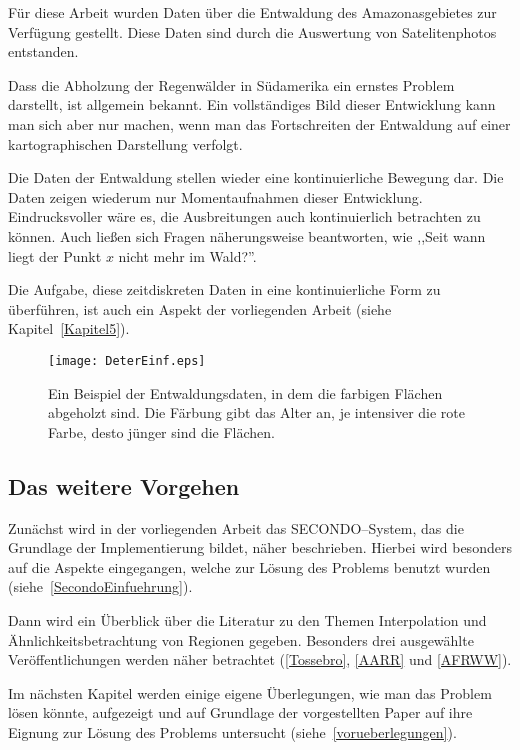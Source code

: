 Für diese Arbeit wurden Daten über die Entwaldung des Amazonasgebietes zur Verfügung gestellt.
Diese Daten sind durch die Auswertung von Satelitenphotos entstanden. 

Dass die Abholzung der Regenwälder in Südamerika ein ernstes Problem darstellt, ist allgemein bekannt. Ein vollständiges Bild dieser Entwicklung kann man sich aber nur machen, wenn man das Fortschreiten der Entwaldung auf einer kartographischen Darstellung verfolgt. 

Die Daten der Entwaldung stellen wieder eine kontinuierliche Bewegung dar. Die Daten zeigen wiederum nur Momentaufnahmen dieser Entwicklung. Eindrucksvoller wäre es, die Ausbreitungen auch kontinuierlich betrachten zu können. Auch ließen sich Fragen näherungsweise beantworten, wie ,,Seit wann liegt der Punkt $x$ nicht mehr im Wald?''.

Die Aufgabe, diese zeitdiskreten Daten in eine kontinuierliche Form zu überführen, ist auch ein Aspekt der vorliegenden Arbeit (siehe Kapitel~\vref{Kapitel5}).

\begin{figure}
	\centering
	\texttt{[image: DeterEinf.eps]}
	\caption[Ein Beispiel für Entwaldungsdaten]{Ein Beispiel der Entwaldungsdaten, in dem die farbigen Flächen abgeholzt sind. Die Färbung gibt das Alter an, je intensiver die rote Farbe, desto jünger sind die Flächen.}
	\label{fig:DeterEinfuehrung}
\end{figure}


\subsection*{Das weitere Vorgehen}

Zunächst wird in der vorliegenden Arbeit das SECONDO--System, das die Grundlage der Implementierung bildet, näher  beschrieben. Hierbei wird besonders auf die Aspekte eingegangen, welche zur Lösung des Problems benutzt wurden (siehe~\vref{SecondoEinfuehrung}).

Dann wird ein Überblick über die Literatur zu den Themen Interpolation und Ähnlichkeitsbetrachtung von Regionen gegeben. Besonders drei ausgewählte Veröffentlichungen werden näher betrachtet (\vref{Tossebro}, \vref{AARR} und \vref{AFRWW}).

Im nächsten Kapitel werden einige eigene Überlegungen, wie man das Problem lösen könnte,  aufgezeigt und auf Grundlage der vorgestellten Paper auf ihre Eignung zur Lösung des Problems untersucht (siehe~\vref{vorueberlegungen}).
 
